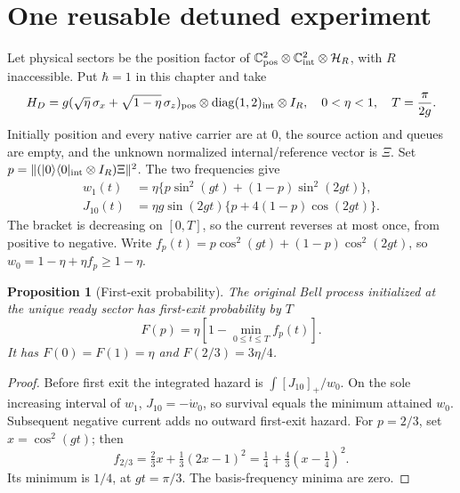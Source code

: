 \documentclass[11pt,oneside,openany]{book}
\newtheorem{proposition}[theorem]{Proposition}
\theoremstyle{definition}
\theoremstyle{remark}\newtheorem{remark}[theorem]{Remark}
\begin{document}
\section{One reusable detuned experiment}
Let physical sectors be the position factor of
$\mathbb C^2_{\rm pos}\otimes\mathbb C^2_{\rm int}\otimes\mathcal H_R$,
with $R$ inaccessible. Put $\hbar=1$ in this chapter and take
\begin{equation}
 H_D=g(\sqrt\eta\,\sigma_x+\sqrt{1-\eta}\,\sigma_z)_{\rm pos}
 \otimes\operatorname{diag}(1,2)_{\rm int}\otimes I_R,
 \quad 0<\eta<1,\quad T=\frac\pi{2g}.
 \label{acc:detunedH}
\end{equation}
Initially position and every native carrier are at $0$, the source action
and queues are empty, and the unknown normalized internal/reference vector
is $\Xi$. Set
$p=\|(\lvert0\rangle\langle0\rvert_{\rm int}\otimes I_R)\Xi\|^2$.
The two frequencies give
\begin{align}
 w_1(t)&=\eta\{p\sin^2(gt)+(1-p)\sin^2(2gt)\},\label{acc:weight}\\
 J_{10}(t)&=\eta g\sin(2gt)\{p+4(1-p)\cos(2gt)\}.
 \label{acc:current}
\end{align}
The bracket is decreasing on $[0,T]$, so the current reverses at most
once, from positive to negative. Write
$f_p(t)=p\cos^2(gt)+(1-p)\cos^2(2gt)$, so
$w_0=1-\eta+\eta f_p\ge1-\eta$.

\begin{proposition}[First-exit probability]\label{acc:firstexit}
The original Bell process initialized at the unique ready sector has
first-exit probability by $T$
\begin{equation}
 F(p)=\eta\left[1-\min_{0\le t\le T}f_p(t)\right].
 \label{acc:firstexitformula}
\end{equation}
It has $F(0)=F(1)=\eta$ and $F(2/3)=3\eta/4$.
\end{proposition}
\begin{proof}
Before first exit the integrated hazard is
$\int[J_{10}]_+/w_0$. On the sole increasing interval of $w_1$,
$J_{10}=-\dot w_0$, so survival equals the minimum attained $w_0$.
Subsequent negative current adds no outward first-exit hazard. For
$p=2/3$, set $x=\cos^2(gt)$; then
\[
 f_{2/3}=\tfrac23x+\tfrac13(2x-1)^2
 =\tfrac14+\tfrac43(x-\tfrac14)^2.
\]
Its minimum is $1/4$, at $gt=\pi/3$. The basis-frequency minima are zero.
\end{proof}
\end{document}
